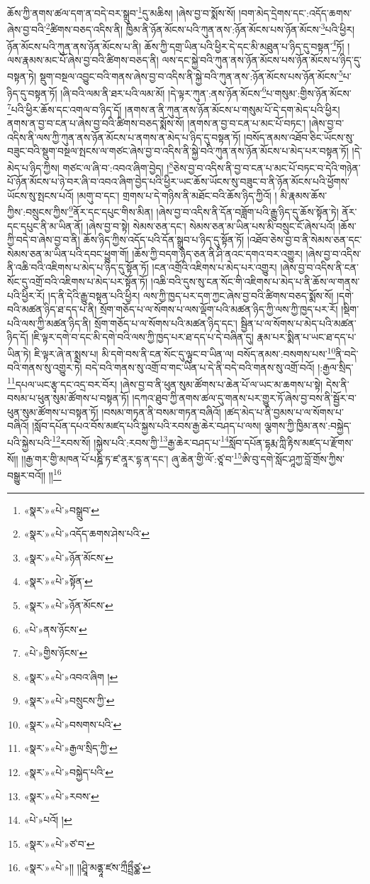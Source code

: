 ཆོས་ཀྱི་ནགས་ཚལ་དག་ན་བདེ་བར་སྒྲུབ་\footnote{«སྣར་»«པེ་»བསྒྲུབ་}དུ་མཆིས། །ཞེས་བྱ་བ་སྨོས་སོ། །བག་མེད་དྲེགས་དང་:འདོད་ཆགས་ཞེས་བྱ་བའི་\footnote{«སྣར་»«པེ་»འདོད་ཆགས་ཤེས་པའི་}ཚིགས་བཅད་འདིས་ནི། ཁྱིམ་ནི་ཉོན་མོངས་པའི་ཀུན་ནས་:ཉོན་མོངས་པས་ཉོན་མོངས་\footnote{«སྣར་»«པེ་»ཉོན་མོངས་}པའི་ཕྱིར། ཉོན་མོངས་པའི་ཀུན་ནས་ཉོན་མོངས་པ་ནི། ཆོས་ཀྱི་དགྲ་ཡིན་པའི་ཕྱིར་དེ་དང་མི་མཐུན་པ་ཉིད་དུ་བསྟན་\footnote{«སྣར་»«པེ་»སྟོན་}ཏོ། །ལས་རྣམས་མང་པོ་ཞེས་བྱ་བའི་ཚིགས་བཅད་ནི། ལས་དང་སྐྱེ་བའི་ཀུན་ནས་ཉོན་མོངས་པས་ཉོན་མོངས་པ་ཉིད་དུ་བསྟན་ཏེ། སྡུག་བསྔལ་འབྱུང་བའི་གནས་ཞེས་བྱ་བ་འདིས་ནི་སྐྱེ་བའི་ཀུན་ནས་:ཉོན་མོངས་པས་ཉོན་མོངས་\footnote{«སྣར་»«པེ་»ཉོན་མོངས་}པ་ཉིད་དུ་བསྟན་ཏོ། །ཞི་བའི་ལམ་ནི་ཐར་པའི་ལམ་མོ། །དེ་ལྟར་ཀུན་:ནས་ཉོན་མོངས་\footnote{«པེ་»ནས་ཉོངས་}པ་གསུམ་:གྱིས་ཉོན་མོངས་\footnote{«པེ་»གྱིས་ཉོངས་}པའི་ཕྱིར་ཆོས་དང་འགལ་བ་ཉིད་དོ། །ནགས་ན་ནི་ཀུན་ནས་ཉོན་མོངས་པ་གསུམ་པོ་དེ་དག་མེད་པའི་ཕྱིར། ནགས་ན་བྱ་བ་ངན་པ་ཞེས་བྱ་བའི་ཚིགས་བཅད་སྨོས་སོ། །ནགས་ན་བྱ་བ་ངན་པ་མང་པོ་བཏང་། །ཞེས་བྱ་བ་འདིས་ནི་ལས་ཀྱི་ཀུན་ནས་ཉོན་མོངས་པ་ནགས་ན་མེད་པ་ཉིད་དུ་བསྟན་ཏོ། །བསོད་ནམས་འཐོབ་ཅིང་ཡོངས་སུ་བཟུང་བའི་སྡུག་བསྔལ་སྤངས་ལ་གཙང་ཞེས་བྱ་བ་འདིས་ནི་སྐྱེ་བའི་ཀུན་ནས་ཉོན་མོངས་པ་མེད་པར་བསྟན་ཏོ། །དེ་མེད་པ་ཉིད་ཀྱིས། གཙང་ལ་ཞི་བ་:འབའ་ཞིག་བྱེད། །\footnote{«སྣར་»«པེ་»འབའ་ཞིག །}ཅེས་བྱ་བ་འདིས་ནི་བྱ་བ་ངན་པ་མང་པོ་བཏང་བ་དེའི་གཉེན་པོ་ཉོན་མོངས་པ་ཉེ་བར་ཞི་བ་འབའ་ཞིག་བྱེད་པའི་ཕྱིར་ཡང་ཆོས་ཡོངས་སུ་བཟུང་བ་ནི་ཉོན་མོངས་པའི་ཕྱོགས་ཡོངས་སུ་སྤངས་པའོ། །མགུ་བ་དང་། གྲགས་པ་དེ་གཉིས་ནི་མཐོང་བའི་ཆོས་ཉིད་ཀྱིའོ། །
མི་རྣམས་ཆོས་ཀྱིས་:བསྲུངས་ཀྱིས་\footnote{«སྣར་»«པེ་»བསྲུངས་ཀྱི་}ནོར་དང་དཔུང་གིས་མིན། །ཞེས་བྱ་བ་འདིས་ནི་དོན་བཟློག་པའི་རྒྱུ་ཉིད་དུ་ཆོས་སྟོན་ཏེ། ནོར་དང་དཔུང་ནི་མ་ཡིན་ནོ། །ཞེས་བྱ་བ་སྟེ། སེམས་ཅན་དང་། སེམས་ཅན་མ་ཡིན་པས་མི་བསྲུང་ངོ་ཞེས་པའོ། །ཆོས་ཀྱི་བདེ་བ་ཞེས་བྱ་བ་ནི། ཆོས་ཉིད་ཀྱིས་འདོད་པའི་དོན་སྒྲུབ་པ་ཉིད་དུ་སྟོན་ཏོ། །འཐོབ་ཅེས་བྱ་བ་ནི་སེམས་ཅན་དང་སེམས་ཅན་མ་ཡིན་པའི་དབང་ཕྱུག་གོ། །ཆོས་ཀྱི་བདག་ཉིད་ཅན་ནི་ཤི་ནའང་དགའ་བར་འགྱུར། །ཞེས་བྱ་བ་འདིས་ནི་འཆི་བའི་འཇིགས་པ་མེད་པ་ཉིད་དུ་སྟོན་ཏོ། །ངན་འགྲོའི་འཇིགས་པ་མེད་པར་འགྱུར། །ཞེས་བྱ་བ་འདིས་ནི་ངན་སོང་དུ་འགྲོ་བའི་འཇིགས་པ་མེད་པར་སྟོན་ཏོ། །འཆི་བའི་དུས་སུ་ངན་སོང་གི་འཇིགས་པ་མེད་པ་ནི་ཆོས་ལ་གནས་པའི་ཕྱིར་རོ། །ད་ནི་དེའི་རྒྱུ་བསྟན་པའི་ཕྱིར། ལས་ཀྱི་ཁྱད་པར་དག་ཀྱང་ཞེས་བྱ་བའི་ཚིགས་བཅད་སྨོས་སོ། །དགེ་བའི་མཚན་ཉིད་ཐ་དད་པ་ནི། སྲོག་གཅོད་པ་ལ་སོགས་པ་ལས་ལྡོག་པའི་མཚན་ཉིད་ཀྱི་ལས་ཀྱི་ཁྱད་པར་རོ། །སྡིག་པའི་ལས་ཀྱི་མཚན་ཉིད་ནི། སྲོག་གཅོད་པ་ལ་སོགས་པའི་མཚན་ཉིད་དང་། སྦྱིན་པ་ལ་སོགས་པ་མེད་པའི་མཚན་ཉིད་དོ། །ཇི་ལྟར་དགེ་བ་དང་མི་དགེ་བའི་ལས་ཀྱི་ཁྱད་པར་ཐ་དད་པ་དེ་བཞིན་དུ། རྣམ་པར་སྨིན་པ་ཡང་ཐ་དད་པ་ཡིན་ཏེ། ཇི་ལྟར་ཞེ་ན་སྨྲས་པ། མི་དགེ་བས་ནི་ངན་སོང་དུ་ལྟུང་བ་ཡིན་ལ། བསོད་ནམས་:བསགས་པས་\footnote{«སྣར་»«པེ་»བསགས་པའི་}ནི་བདེ་བའི་གནས་སུ་འགྱུར་ཏེ། བདེ་བའི་གནས་སུ་འགྲོ་བ་གང་ཡིན་པ་དེ་ནི་བདེ་བའི་གནས་སུ་འགྲོ་བའོ། །:རྒྱལ་སྲིད་\footnote{«སྣར་»«པེ་»རྒྱལ་སྲིད་ཀྱི་}དཔལ་ཡང་རྩྭ་དང་འདྲ་བར་བོར། །ཞེས་བྱ་བ་ནི་ཕུན་སུམ་ཚོགས་པ་ཆེན་པོ་ལ་ཡང་མ་ཆགས་པ་སྟེ། དེས་ནི་བསམ་པ་ཕུན་སུམ་ཚོགས་པ་བསྟན་ཏོ། །དཀའ་ཐུབ་ཀྱི་ནགས་ཚལ་དུ་གནས་པར་གྱུར་ཏོ་ཞེས་བྱ་བས་ནི་སྦྱོར་བ་ཕུན་སུམ་ཚོགས་པ་བསྟན་ཏོ། །བསམ་གཏན་ནི་བསམ་གཏན་བཞིའོ། །ཚད་མེད་པ་ནི་བྱམས་པ་ལ་སོགས་པ་བཞིའོ། །སློབ་དཔོན་དཔའ་བོས་མཛད་པའི་སྐྱས་པའི་རབས་རྒྱ་ཆེར་བཤད་པ་ལས། ལྕགས་ཀྱི་ཁྱིམ་ནས་:བསྐྱེད་པའི་སྐྱེས་པའི་\footnote{«སྣར་»«པེ་»བསྐྱེད་པའི་}རབས་སོ། །སྐྱེས་པའི་:རབས་ཀྱི་\footnote{«སྣར་»«པེ་»རབས་}རྒྱ་ཆེར་བཤད་པ་\footnote{«པེ་»པའོ། །}སློབ་དཔོན་དྷརྨ་ཀླི་རྟིས་མཛད་པ་རྫོགས་སོ།། །།རྒྱ་གར་གྱི་མཁན་པོ་པཎྜི་ཏ་ཛ་ནཱར་དྷ་ན་དང་། ཞུ་ཆེན་གྱི་ལོ་:ཙཱ་བ་\footnote{«སྣར་»«པེ་»ཙ་བ་}ཨི་བུ་དགེ་སློང་ཤཱཀྱ་བློ་གྲོས་ཀྱིས་བསྒྱུར་བའོ།། །།\footnote{«སྣར་»«པེ་»།། །།ཤྲཱི་མནྷཱ་ཛས་ཀྲྀཏྤྲྀཙྪ་}